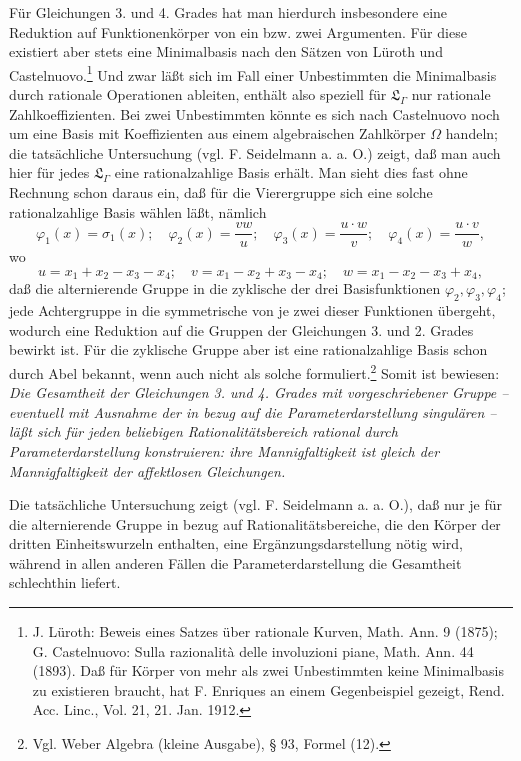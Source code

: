 \documentclass[11pt]{article}
\begin{document}
Für Gleichungen 3. und 4. Grades hat man hierdurch insbesondere eine Reduktion auf Funktionenkörper von ein bzw. zwei Argumenten. Für diese existiert aber stets eine Minimalbasis nach den Sätzen von Lüroth und Castelnuovo.\footnote{J. Lüroth: Beweis eines Satzes über rationale Kurven, Math. Ann. 9 (1875); G. Castelnuovo: Sulla razionalità delle involuzioni piane, Math. Ann. 44 (1893). Daß für Körper von mehr als zwei Unbestimmten keine Minimalbasis zu existieren braucht, hat F. Enriques an einem Gegenbeispiel gezeigt, Rend. Acc. Linc., Vol. 21, 21. Jan. 1912.} Und zwar läßt sich im Fall einer Unbestimmten die Minimalbasis durch rationale Operationen ableiten, enthält also speziell für $\mathfrak L_\Gamma$ nur rationale Zahlkoeffizienten. Bei zwei Unbestimmten könnte es sich nach Castelnuovo noch um eine Basis mit Koeffizienten aus einem algebraischen Zahlkörper $\Omega$ handeln; die tatsächliche Untersuchung (vgl. F. Seidelmann a. a. O.) zeigt, daß man auch hier für jedes $\mathfrak L_\Gamma$ eine rationalzahlige Basis erhält. Man sieht dies fast ohne Rechnung schon daraus ein, daß für die Vierergruppe sich eine solche rationalzahlige Basis wählen läßt, nämlich
\[
\varphi_1(x)=\sigma_1(x);\quad \varphi_2(x)=\frac{v w}{u};\quad \varphi_3(x)=\frac{u\cdot w}{v};\quad \varphi_4(x)=\frac{u\cdot v}{w},
\]
wo
\[
u=x_1+x_2-x_3-x_4;\quad v=x_1-x_2+x_3-x_4;\quad w=x_1-x_2-x_3+x_4,
\]
daß die alternierende Gruppe in die zyklische der drei Basisfunktionen $\varphi_2,\varphi_3,\varphi_4$; jede Achtergruppe in die symmetrische von je zwei dieser Funktionen übergeht, wodurch eine Reduktion auf die Gruppen der Gleichungen 3. und 2. Grades bewirkt ist. Für die zyklische Gruppe aber ist eine rationalzahlige Basis schon durch Abel bekannt, wenn auch nicht als solche formuliert.\footnote{Vgl. Weber Algebra (kleine Ausgabe), § 93, Formel (12).} Somit ist bewiesen: \emph{Die Gesamtheit der Gleichungen 3. und 4. Grades mit vorgeschriebener Gruppe -- eventuell mit Ausnahme der in bezug auf die Parameterdarstellung singulären -- läßt sich für jeden beliebigen Rationalitätsbereich rational durch Parameterdarstellung konstruieren: ihre Mannigfaltigkeit ist gleich der Mannigfaltigkeit der affektlosen Gleichungen.}

Die tatsächliche Untersuchung zeigt (vgl. F. Seidelmann a. a. O.), daß nur je für die alternierende Gruppe in bezug auf Rationalitätsbereiche, die den Körper der dritten Einheitswurzeln enthalten, eine Ergänzungsdarstellung nötig wird, während in allen anderen Fällen die Parameterdarstellung die Gesamtheit schlechthin liefert.
\end{document}
